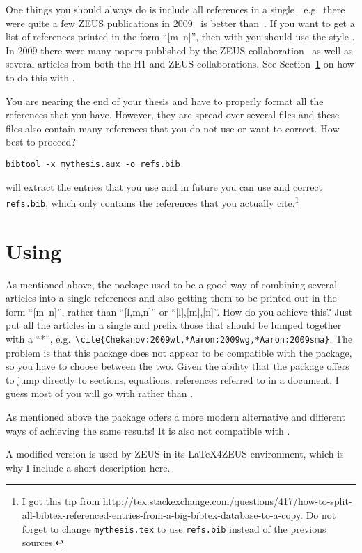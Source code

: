 One things you should always do is include all references in a single
. e.g.\ there were quite a few ZEUS publications in
2009~\cite{Chekanov:2009qja,Chekanov:2009zz,Chekanov:2009tu} is better
than~\cite{Chekanov:2009qja}\cite{Chekanov:2009zz}\cite{Chekanov:2009tu}.
If you want to get a list of references printed in the form \enquote{[m--n]},
then with  you should use the style
. In 2009 there were many papers published by the
ZEUS
collaboration~\cite{Chekanov:2009qja,Chekanov:2009zz,Chekanov:2009tu}
as well as several articles from both the H1 and ZEUS
collaborations\cite{Chekanov:2009wt,Aaron:2009wg}. See
Section~\ref{sec:ref:mcite} on how to do this with \BibTeX.

You are nearing the end of your thesis and have to properly format all
the references that you have. However, they are spread over several
files and these files also contain many references that you do not use
or want to correct. How best to proceed?
\begin{verbatim}
bibtool -x mythesis.aux -o refs.bib
\end{verbatim}
will extract the entries that you use and in future you can use and
correct \texttt{refs.bib}, which only contains the references that you
actually cite.\footnote{%
I got this tip from
\url{http://tex.stackexchange.com/questions/417/how-to-split-all-bibtex-referenced-entries-from-a-big-bibtex-database-to-a-copy}. Do
not forget to change \texttt{mythesis.tex} to use
\texttt{refs.bib} instead of the previous sources.}


\section{Using }
\label{sec:ref:mcite}

As mentioned above, the  package used to be a good way
of combining several articles into a single references and also
getting them to be printed out in the form \enquote{[m--n]}, rather
than \enquote{[l,m,n]} or \enquote{[l],[m],[n]}. How do you achieve
this?  Just put all the articles in a single  and prefix
those that should be lumped together with a \enquote{*}, e.g.\
\verb+\cite{Chekanov:2009wt,*Aaron:2009wg,*Aaron:2009sma}+.  The
problem is that this package does not appear to be compatible with the
 package, so you have to choose between the
two. Given the ability that the \Package{hyperref} package offers to
jump directly to sections, equations, references referred to in a
document, I guess most of you will go with \Package{hyperref} rather
than \Package{mcite}.

As mentioned above the  package offers a
more modern alternative and different ways of achieving the same
results! It is also not compatible with .

A modified version \Package{mcite} is used by ZEUS in its LaTeX4ZEUS
environment, which is why I include a short description here.

